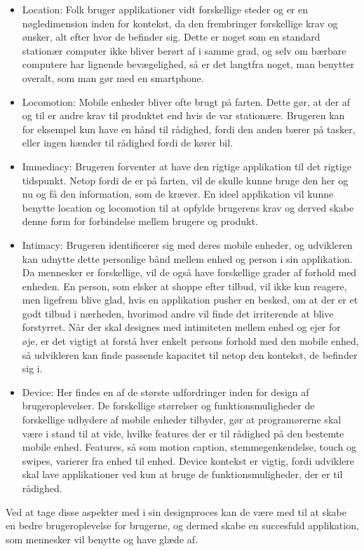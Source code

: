 \documentclass[a4paper,10pt,titlepage]{article}
\begin{document}
\begin{itemize}
\item
Location: Folk bruger applikationer vidt forskellige steder og er en nøgledimension inden for kontekst, da den frembringer forskellige krav og ønsker, alt efter hvor de befinder sig. Dette er noget som en standard stationær computer ikke bliver berørt af i samme grad, og selv om bærbare computere har lignende bevægelighed, så er det langtfra noget, man benytter overalt, som man gør med en smartphone.
\item
Locomotion: Mobile enheder bliver ofte brugt på farten. Dette gør, at der af og til er andre krav til produktet end hvis de var stationære. Brugeren kan for eksempel kun have en hånd til rådighed, fordi den anden bærer på tasker, eller ingen hænder til rådighed fordi de kører bil. 
\item
Immediacy: Brugeren forventer at have den rigtige applikation til det rigtige tidspunkt. Netop fordi de er på farten, vil de skulle kunne bruge den her og nu og få den information, som de kræver. En ideel applikation vil kunne benytte location og locomotion til at opfylde brugerens krav og derved skabe denne form for forbindelse mellem brugere og produkt.
\item
Intimacy: Brugeren identificerer sig med deres mobile enheder, og udvikleren kan udnytte dette personlige bånd mellem enhed og person i sin applikation. Da mennesker er forskellige, vil de også have forskellige grader af forhold med enheden. En person, som elsker at shoppe efter tilbud, vil ikke kun reagere, men ligefrem blive glad, hvis en applikation pusher en besked, om at der er et godt tilbud i nærheden, hvorimod andre vil finde det irriterende at blive forstyrret. Når der skal designes med intimiteten mellem enhed og ejer for øje, er det vigtigt at forstå hver enkelt persons forhold med den mobile enhed, så udvikleren kan finde passende kapacitet til netop den kontekst, de befinder sig i. 
\item
Device: Her findes en af de største udfordringer inden for design af brugeroplevelser. De forskellige størrelser og funktionsmuligheder de forskellige udbydere af mobile enheder tilbyder, gør at programørerne skal være i stand til at vide, hvilke features der er til rådighed på den bestemte mobile enhed. Features, så som motion caption, stemmegenkendelse, touch og swipes, varierer fra enhed til enhed. Device kontekst er vigtig, fordi udviklere skal lave applikationer ved kun at bruge de funktionsmuligheder, der er til rådighed.
\end{itemize}
Ved at tage disse aspekter med i sin designproces kan de være med til at skabe en bedre brugeroplevelse for brugerne, og dermed skabe en succesfuld applikation, som mennesker vil benytte og have glæde af.\parencite{AppBestPractice}
\end{document}
